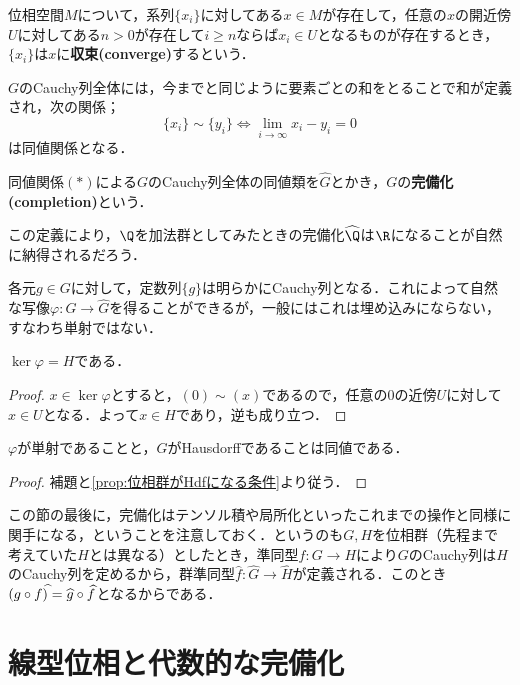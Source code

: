 \begin{defi}[収束]
	位相空間$M$について，系列$\{x_i\}$に対してある$x\in M$が存在して，任意の$x$の開近傍$U$に対してある$n>0$が存在して$i\geq n$ならば$x_i\in U$となるものが存在するとき，$\{x_i\}$は$x$に\textbf{収束(converge)}するという．
\end{defi}

$G$のCauchy列全体には，今までと同じように要素ごとの和をとることで和が定義され，次の関係；
\[\{x_i\}\sim\{y_i\}\Longleftrightarrow \lim_{i\to\infty} x_i-y_i= 0\tag{$\ast$}\]
は同値関係となる．

\begin{defi}[完備化]
	同値関係$(\ast)$による$G$のCauchy列全体の同値類を$\widehat G$とかき，$G$の\textbf{完備化(completion)}という．
\end{defi}

この定義により，$\Q$を加法群としてみたときの完備化$\widehat{\Q}$は$\R$になることが自然に納得されるだろう．

各元$g\in G$に対して，定数列$\{g\}$は明らかにCauchy列となる．これによって自然な写像$\varphi:G\to\widehat{G}$を得ることができるが，一般にはこれは埋め込みにならない，すなわち単射ではない．

\begin{lem}
	$\ker\varphi=H$である．
\end{lem}

\begin{proof}
	$x\in\ker\varphi$とすると，$(0)\sim(x)$であるので，任意の$0$の近傍$U$に対して$x\in U$となる．よって$x\in H$であり，逆も成り立つ．
\end{proof}

\begin{prop}
	$\varphi$が単射であることと，$G$がHausdorffであることは同値である．
\end{prop}

\begin{proof}
	補題と\ref{prop:位相群がHdfになる条件}より従う．
\end{proof}

この節の最後に，完備化はテンソル積や局所化といったこれまでの操作と同様に関手になる，ということを注意しておく．というのも$G,H$を位相群（先程まで考えていた$H$とは異なる）としたとき，準同型$f:G\to H$により$G$のCauchy列は$H$のCauchy列を定めるから，群準同型$\widehat{f}:\widehat{G}\to\widehat{H}$が定義される．このとき$(g\circ f)\widehat{\mathstrut}=\widehat{g}\circ\widehat{f}$となるからである．
\section{線型位相と代数的な完備化}


